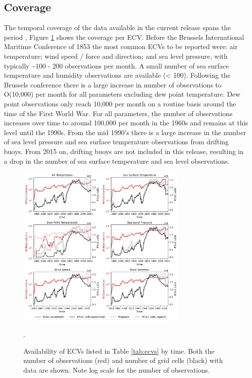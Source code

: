 \subsection{Coverage}
The temporal coverage of the data available in the current release spans the period \datatimerange{}, Figure \ref{fig:ecv_ts1} shows the coverage per ECV. 
Before the Brussels International Maritime Conference of 1853 the most common ECVs to be reported were: air temperature; wind speed / force and direction; and sea level pressure, with typically \sim 100 - 200 observations per month. 
A small number of sea surface temperature and humidity observations are available (< 100).
Following the Brussels conference there is a large increase in number of observations to O(10,000) per month for all parameters excluding dew point temperature. 
Dew point observations only reach 10,000 per month on a routine basis around the time of the First World War.
For all parameters, the number of observations increases over time to around 100,000 per month in the 1960s and remains at this level until the 1990s.
From the mid 1990's there is a large increase in the number of sea level pressure and sea surface temperature observations from drifting buoys.
From 2015 on, drifting buoys are not included in this release, resulting in a drop in the number of sea surface temperature and sea level observations.

\begin{figure}[h]
\centering
    \includegraphics[width=0.75\textwidth]{resources/ecv_coverage_ts_grid.png}
    \caption{Availability of ECVs listed in Table \ref{tab:ecvs} by time. Both the number of observations (red) and number of grid cells (black) with data are shown. Note log scale for the number of observations.\\}.
    \label{fig:ecv_ts1}
\end{figure}

